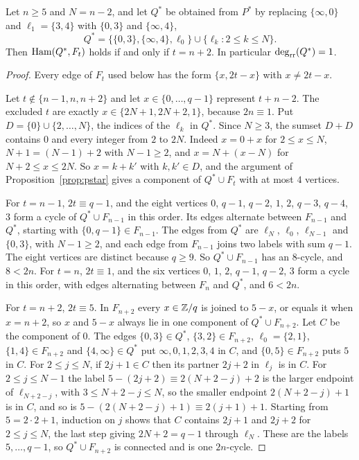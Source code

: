 \begin{proposition}\label{prop:oneQ}
Let $n\ge5$ and $N=n-2$, and let $Q^*$ be obtained from $P^*$ by replacing $\{\infty,0\}$ and $\ell_1=\{3,4\}$ with $\{0,3\}$ and $\{\infty,4\}$,
\[
Q^*=\{\{0,3\},\{\infty,4\},\ell_0\}\cup\{\ell_k:2\le k\le N\}.
\]
Then $\operatorname{Ham}(Q^*,F_t)$ holds if and only if $t=n+2$. In particular $\deg_{\mathrm{rr}}(Q^*)=1$.
\end{proposition}

\begin{proof}
Every edge of $F_t$ used below has the form $\{x,2t-x\}$ with $x\ne2t-x$.

Let $t\notin\{n-1,n,n+2\}$ and let $x\in\{0,\dots,q-1\}$ represent $t+n-2$. The excluded $t$ are exactly $x\in\{2N+1,2N+2,1\}$, because $2n\equiv1$. Put $D=\{0\}\cup\{2,\dots,N\}$, the indices of the $\ell_k$ in $Q^*$. Since $N\ge3$, the sumset $D+D$ contains $0$ and every integer from $2$ to $2N$. Indeed $x=0+x$ for $2\le x\le N$, $N+1=(N-1)+2$ with $N-1\ge2$, and $x=N+(x-N)$ for $N+2\le x\le2N$. So $x=k+k'$ with $k,k'\in D$, and the argument of Proposition~\ref{prop:pstar} gives a component of $Q^*\cup F_t$ with at most $4$ vertices.

For $t=n-1$, $2t\equiv q-1$, and the eight vertices $0$, $q-1$, $q-2$, $1$, $2$, $q-3$, $q-4$, $3$ form a cycle of $Q^*\cup F_{n-1}$ in this order. Its edges alternate between $F_{n-1}$ and $Q^*$, starting with $\{0,q-1\}\in F_{n-1}$. The edges from $Q^*$ are $\ell_N$, $\ell_0$, $\ell_{N-1}$ and $\{0,3\}$, with $N-1\ge2$, and each edge from $F_{n-1}$ joins two labels with sum $q-1$. The eight vertices are distinct because $q\ge9$. So $Q^*\cup F_{n-1}$ has an $8$-cycle, and $8<2n$. For $t=n$, $2t\equiv1$, and the six vertices $0$, $1$, $2$, $q-1$, $q-2$, $3$ form a cycle in this order, with edges alternating between $F_n$ and $Q^*$, and $6<2n$.

For $t=n+2$, $2t\equiv5$. In $F_{n+2}$ every $x\in\mathbb{Z}/q$ is joined to $5-x$, or equals it when $x=n+2$, so $x$ and $5-x$ always lie in one component of $Q^*\cup F_{n+2}$. Let $C$ be the component of $0$. The edges $\{0,3\}\in Q^*$, $\{3,2\}\in F_{n+2}$, $\ell_0=\{2,1\}$, $\{1,4\}\in F_{n+2}$ and $\{4,\infty\}\in Q^*$ put $\infty,0,1,2,3,4$ in $C$, and $\{0,5\}\in F_{n+2}$ puts $5$ in $C$. For $2\le j\le N$, if $2j+1\in C$ then its partner $2j+2$ in $\ell_j$ is in $C$. For $2\le j\le N-1$ the label $5-(2j+2)\equiv2(N+2-j)+2$ is the larger endpoint of $\ell_{N+2-j}$, with $3\le N+2-j\le N$, so the smaller endpoint $2(N+2-j)+1$ is in $C$, and so is $5-(2(N+2-j)+1)\equiv2(j+1)+1$. Starting from $5=2\cdot2+1$, induction on $j$ shows that $C$ contains $2j+1$ and $2j+2$ for $2\le j\le N$, the last step giving $2N+2=q-1$ through $\ell_N$. These are the labels $5,\dots,q-1$, so $Q^*\cup F_{n+2}$ is connected and is one $2n$-cycle.
\end{proof}

